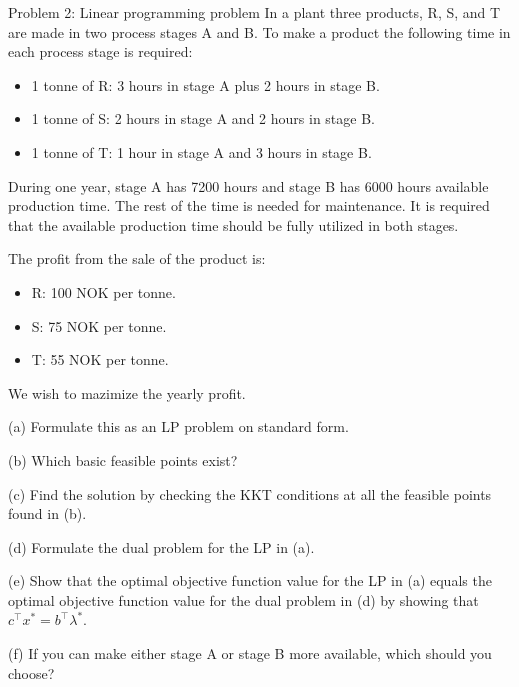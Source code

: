 
\begin{problem}{Problem 2: Linear programming problem}
  In a plant three products, R, S, and T are made in two process stages A and B. 
  To make a product the following time in each process stage is required: 
  \begin{itemize}
    \item 1 tonne of R: 3 hours in stage A plus 2 hours in stage B. 
    \item 1 tonne of S: 2 hours in stage A and 2 hours in stage B. 
    \item 1 tonne of T: 1 hour in stage A and 3 hours in stage B.
  \end{itemize}
  During one year, stage A has 7200 hours and stage B has 6000 hours available production time. 
  The rest of the time is needed for maintenance. It is required that the available production time should be fully utilized in both stages.
  
  \medskip The profit from the sale of the product is: 
  \begin{itemize}
    \item R: 100 NOK per tonne.
    \item S: 75 NOK per tonne.
    \item T: 55 NOK per tonne.
  \end{itemize}
  We wish to mazimize the yearly profit.

  
  \medskip (a) Formulate this as an LP problem on standard form.
  
  \medskip (b) Which basic feasible points exist?
  
  \medskip (c) Find the solution by checking the KKT conditions at all the feasible points found in (b).
  
  \medskip (d) Formulate the dual problem for the LP in (a). 
  
  \medskip (e) Show that the optimal objective function value for the LP in (a) equals the optimal objective 
  function value for the dual problem in (d) by showing that $c^{\top}x^* = b^{\top}\lambda^*$.
  
  \medskip (f) If you can make either stage A or stage B more available, which should you choose?


\end{problem}

